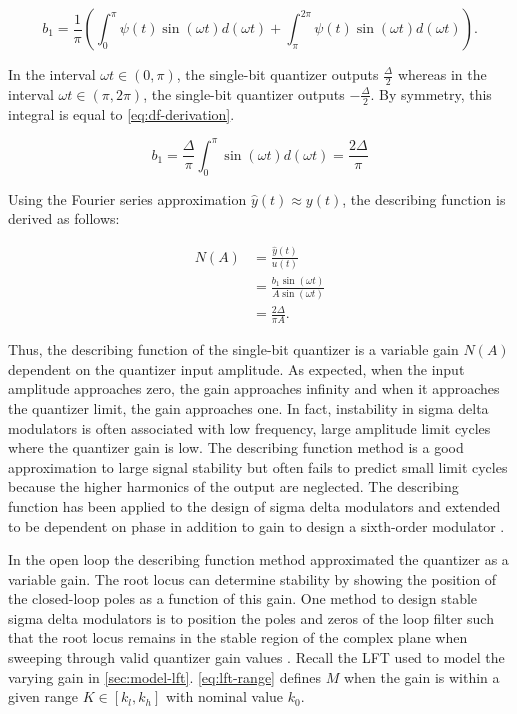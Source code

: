 \begin{equation*}
	b_1 = \frac{1}{\pi}\left(\int_0^\pi\psi(t)\sin(\omega t)d(\omega t) + \int_\pi^{2\pi}\psi(t)\sin(\omega t)d(\omega t)\right).
\end{equation*}

In the interval $\omega t \in (0, \pi)$, the single-bit quantizer outputs $\frac{\Delta}{2}$ whereas in the interval $\omega t \in (\pi, 2\pi)$, the single-bit quantizer outputs $-\frac{\Delta}{2}$. By symmetry, this integral is equal to \autoref{eq:df-derivation}.

\begin{equation}
	b_1 = \frac{\Delta}{\pi}\int_0^\pi \sin(\omega t)d(\omega t) = \frac{2\Delta}{\pi} \label{eq:df-derivation}
\end{equation}

Using the Fourier series approximation $\hat{y}(t) \approx y(t)$, the describing function is derived as follows:

\begin{align*}
	N(A) &= \frac{\hat{y}(t)}{u(t)} \\
	&= \frac{b_1\sin(\omega t)}{A\sin(\omega t)} \\
	&= \frac{2\Delta}{\pi A}.
\end{align*}

Thus, the describing function of the single-bit quantizer is a variable gain $N(A)$ dependent on the quantizer input amplitude. As expected, when the input amplitude approaches zero, the gain approaches infinity and when it approaches the quantizer limit, the gain approaches one. In fact, instability in sigma delta modulators is often associated with low frequency, large amplitude limit cycles where the quantizer gain is low. The describing function method is a good approximation to large signal stability but often fails to predict small limit cycles because the higher harmonics of the output are neglected. The describing function has been applied to the design of sigma delta modulators \cite{Engelen1999} and extended to be dependent on phase in addition to gain to design a sixth-order modulator \cite{VanEngelen1999a}.

In the open loop the describing function method approximated the quantizer as a variable gain. The root locus can determine stability by showing the position of the closed-loop poles as a function of this gain. One method to design stable sigma delta modulators is to position the poles and zeros of the loop filter such that the root locus remains in the stable region of the complex plane when sweeping through valid quantizer gain values \cite{Yang2002, Kuo2006, Kang2014}. Recall the \gls{LFT} used to model the varying gain in \autoref{sec:model-lft}. \autoref{eq:lft-range} defines $M$ when the gain is within a given range $K \in [k_l, k_h]$ with nominal value $k_0$.

